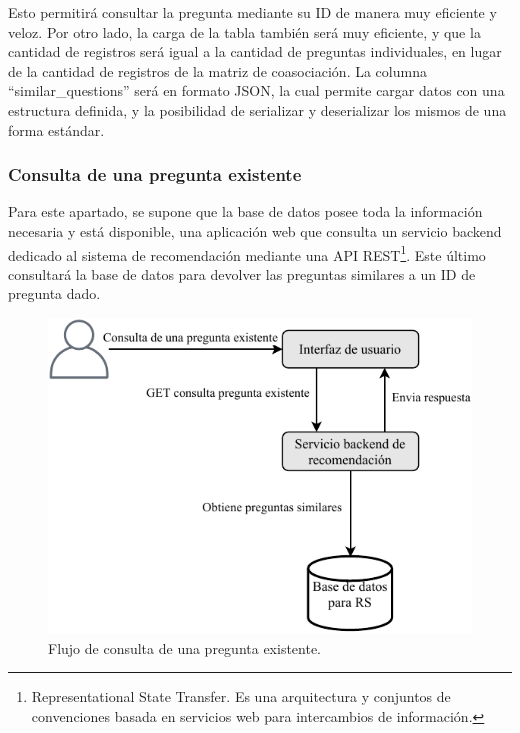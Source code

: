 \bigskip Esto permitirá consultar la pregunta mediante su ID de manera muy eficiente y veloz. Por otro lado, la carga de la tabla también será muy eficiente, y que la cantidad de registros será igual a la cantidad de preguntas individuales, en lugar de la cantidad de registros de la matriz de coasociación. La columna “similar\_questions” será en formato JSON, la cual permite cargar datos con una estructura definida, y la posibilidad de serializar y deserializar los mismos de una forma estándar.

\subsubsection{Consulta de una pregunta existente}
Para este apartado, se supone que la base de datos posee toda la información necesaria y está disponible, una aplicación web que consulta un servicio backend dedicado al sistema de recomendación mediante una API REST\footnote{Representational State Transfer. Es una arquitectura y conjuntos de convenciones basada en servicios web para intercambios de información.}. Este último consultará la base de datos para devolver las preguntas similares a un ID de pregunta dado.

\begin{figure}[h!]
	\centering
	\includegraphics[width=0.6\linewidth]{8_problema_investigacion/imagenes/implementacion_rs_consulta}
	\caption{Flujo de consulta de una pregunta existente.}
	\label{fig:implementacionrsconsulta}
\end{figure}

